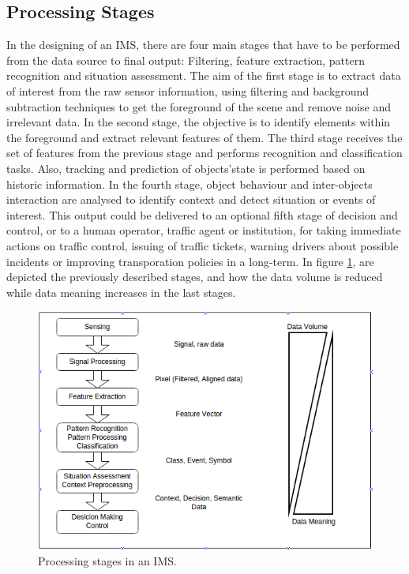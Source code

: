 \subsection{Processing Stages}

In the designing of an IMS, there are four main stages that have to be performed from the data source to final output: Filtering, feature extraction, pattern recognition and situation assessment. The aim of the first stage is to extract data of interest from the raw sensor information, using filtering and background subtraction techniques to get the foreground of the scene and remove noise and irrelevant data. In the second stage, the objective is to identify elements within the foreground and extract relevant features of them. The third stage receives the set of features from the previous stage and performs recognition and classification tasks. Also, tracking and prediction of objects'state is performed based on historic information. In the fourth stage, object behaviour and inter-objects interaction are analysed to identify context and detect situation or events of interest. This output could be delivered to an optional fifth stage of decision and control, or to a human operator, traffic agent or institution, for taking immediate actions on traffic control, issuing of traffic tickets, warning drivers about possible incidents or improving transporation policies in a long-term. In figure \ref{proc_stages}, are depicted the previously described stages, and how the data volume is reduced while data meaning increases in the last stages.

\begin{figure}[ht!]
\centering
\includegraphics[scale=0.55]{fig/3/proc_stages.png}
\caption{Processing stages in an IMS.}
\label{proc_stages}
\end{figure}

